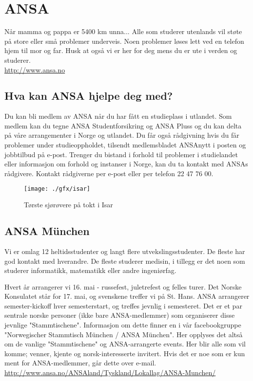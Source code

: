 \chapter{ANSA}
Når mamma og pappa er 5400 km unna...
Alle som studerer utenlands vil støte på store eller små problemer underveis. Noen problemer løses lett ved en telefon hjem til mor og far. Husk at også vi er her for deg mens du er ute i verden og studerer. \\
\url{http://www.ansa.no}


\section{Hva kan ANSA hjelpe deg med?}
Du kan bli medlem av ANSA når du har fått en studieplass i utlandet. Som medlem kan du tegne ANSA Studentforsikring og ANSA Pluss og du kan delta på våre arrangementer i Norge og utlandet. Du får også rådgivning hvis du får problemer under studieoppholdet, tilsendt medlemsbladet ANSAnytt i posten og jobbtilbud på e-post.
Trenger du bistand i forhold til problemer i studielandet eller informasjon om forhold og instanser i Norge, kan du ta kontakt med ANSAs rådgivere. Kontakt rådgiverne per e-post eller per telefon 22 47 76 00.


\begin{figure}[h]
\center
\texttt{[image: ./gfx/isar]}
\caption{Tørste sjørøvere på tokt i Isar}
\end{figure}





\section{ANSA München}
Vi er omlag 12 heltidsstudenter og langt flere utvekslingsstudenter. De fleste har god kontakt med hverandre. De fleste studerer medisin, i tillegg er det noen som studerer informatikk, matematikk eller andre ingeniørfag.

Hvert år arrangerer vi 16. mai - russefest, juletrefest og felles turer. Det Norske Konsulatet står for 17. mai, og svenskene treffer vi på St. Hans.
ANSA arrangerer semester-kickoff hver semesterstart, og treffes jevnlig i semesteret. Det er et par sentrale norske personer (ikke bare ANSA-medlemmer) som organiserer disse jevnlige "Stammtischene". Informasjon om dette finner en i vår facebookgruppe "Norwegischer Stammtisch München / ANSA München". Her opplyses det altså om de vanlige "Stammtischene" og ANSA-arrangerte events. Her blir alle som vil komme; venner, kjente og norsk-interesserte invitert. Hvis det er noe som er kun ment for ANSA-medlemmer, går dette over e-mail.\\
\url{http://www.ansa.no/ANSAland/Tyskland/Lokallag/ANSA-Munchen/}

